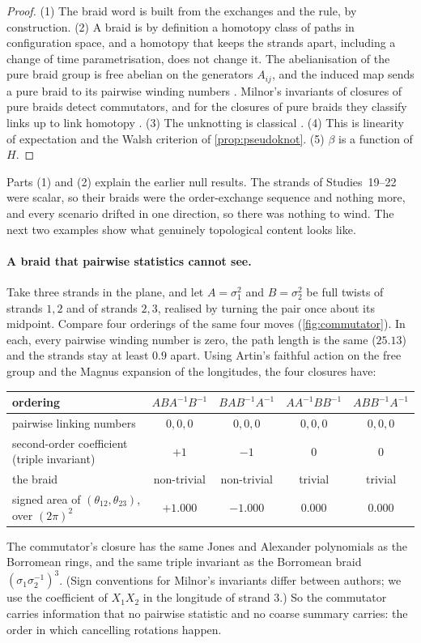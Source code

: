 \documentclass[11pt]{article}
\theoremstyle{definition}\newtheorem{definition}[theorem]{Definition}\newtheorem{remark}[theorem]{Remark}\newtheorem{example}[theorem]{Example}\newtheorem{problem}[theorem]{Open problem}\crefname{problem}{Problem}{Problems}
\begin{document}
\begin{proof}
(1) The braid word is built from the exchanges and the rule, by construction. (2) A braid is by definition a homotopy class of paths in configuration space, and a homotopy that keeps the strands apart, including a change of time parametrisation, does not change it. The abelianisation of the pure braid group is free abelian on the generators $A_{ij}$, and the induced map sends a pure braid to its pairwise winding numbers \cite{Artin1947,Birman1974}. Milnor's invariants of closures of pure braids detect commutators, and for the closures of pure braids they classify links up to link homotopy \cite{Milnor1954,HabeggerLin1990}. (3) The unknotting is classical \cite{Rolfsen1976}. (4) This is linearity of expectation and the Walsh criterion of \cref{prop:pseudoknot}. (5) $\beta$ is a function of $H$.
\end{proof}

Parts (1) and (2) explain the earlier null results. The strands of Studies~19--22 were scalar, so their braids were the order-exchange sequence and nothing more, and every scenario drifted in one direction, so there was nothing to wind. The next two examples show what genuinely topological content looks like.

\paragraph{A braid that pairwise statistics cannot see.} Take three strands in the plane, and let $A=\sigma_1^2$ and $B=\sigma_2^2$ be full twists of strands $1,2$ and of strands $2,3$, realised by turning the pair once about its midpoint. Compare four orderings of the same four moves (\cref{fig:commutator}). In each, every pairwise winding number is zero, the path length is the same ($25.13$) and the strands stay at least $0.9$ apart. Using Artin's faithful action on the free group and the Magnus expansion of the longitudes, the four closures have:
\begin{center}\small
\begin{tabular}{lcccc}
\toprule
ordering & $ABA^{-1}B^{-1}$ & $BAB^{-1}A^{-1}$ & $AA^{-1}BB^{-1}$ & $ABB^{-1}A^{-1}$\\\midrule
pairwise linking numbers & $0,0,0$ & $0,0,0$ & $0,0,0$ & $0,0,0$\\
second-order coefficient (triple invariant) & $+1$ & $-1$ & $0$ & $0$\\
the braid & non-trivial & non-trivial & trivial & trivial\\
signed area of $(\theta_{12},\theta_{23})$, over $(2\pi)^2$ & $+1.000$ & $-1.000$ & $0.000$ & $0.000$\\
\bottomrule
\end{tabular}
\end{center}
The commutator's closure has the same Jones and Alexander polynomials as the Borromean rings, and the same triple invariant as the Borromean braid $(\sigma_1\sigma_2^{-1})^3$. (Sign conventions for Milnor's invariants differ between authors; we use the coefficient of $X_1X_2$ in the longitude of strand $3$.) So the commutator carries information that no pairwise statistic and no coarse summary carries: the order in which cancelling rotations happen.
\end{document}
